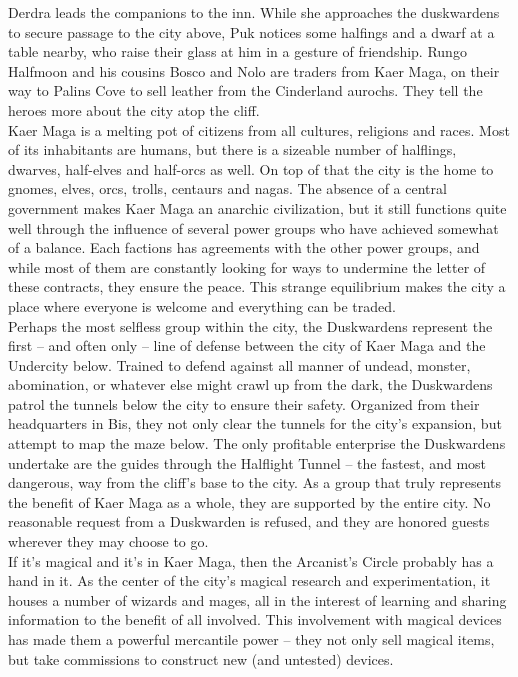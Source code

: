 Derdra leads the companions to the inn. While she approaches the duskwardens to secure passage to the city above, Puk notices some halfings and a dwarf at a table nearby, who raise their glass at him in a gesture of friendship. Rungo Halfmoon and his cousins Bosco and Nolo are traders from Kaer Maga, on their way to Palins Cove to sell leather from the Cinderland aurochs. They tell the heroes more about the city atop the cliff.\\

Kaer Maga is a melting pot of citizens from all cultures, religions and races. Most of its inhabitants are humans, but there is a sizeable number of halflings, dwarves, half-elves and half-orcs as well. On top of that the city is the home to gnomes, elves, orcs, trolls, centaurs and nagas. The absence of a central government makes Kaer Maga an anarchic civilization, but it still functions quite well through the influence of several power groups who have achieved somewhat of a balance. Each factions has agreements with the other power groups, and while most of them are constantly looking for ways to undermine the letter of these contracts, they ensure the peace. This strange equilibrium makes the city a place where everyone is welcome and everything can be traded.\\

Perhaps the most selfless group within the city, the Duskwardens represent the first -- and often only -- line of defense between the city of Kaer Maga and the Undercity below. Trained to defend against all manner of undead, monster, abomination, or whatever else might crawl up from the dark, the Duskwardens patrol the tunnels below the city to ensure their safety. Organized from their headquarters in Bis, they not only clear the tunnels for the city's expansion, but attempt to map the maze below. The only profitable enterprise the Duskwardens undertake are the guides through the Halflight Tunnel -- the fastest, and most dangerous, way from the cliff's base to the city. As a group that truly represents the benefit of Kaer Maga as a whole, they are supported by the entire city. No reasonable request from a Duskwarden is refused, and they are honored guests wherever they may choose to go.\\

If it's magical and it's in Kaer Maga, then the Arcanist's Circle probably has a hand in it. As the center of the city's magical research and experimentation, it houses a number of wizards and mages, all in the interest of learning and sharing information to the benefit of all involved. This involvement with magical devices has made them a powerful mercantile power -- they not only sell magical items, but take commissions to construct new (and untested) devices.\\


